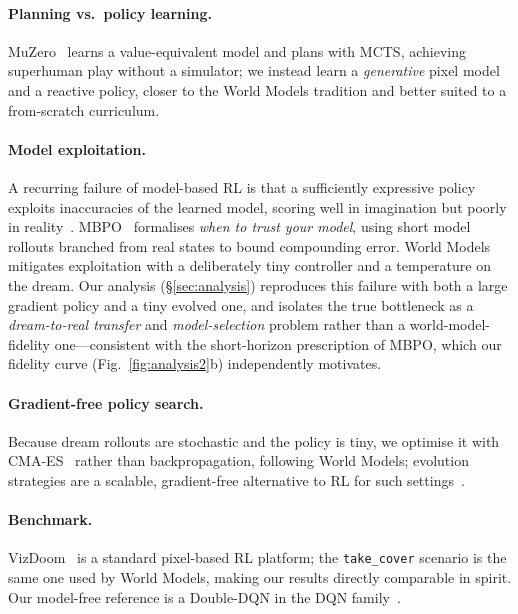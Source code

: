 \documentclass[11pt]{article}
\begin{document}
\paragraph{Planning vs.\ policy learning.} MuZero~\cite{schrittwieser2020} learns a value-equivalent
model and plans with MCTS, achieving superhuman play without a simulator; we instead learn a
\emph{generative} pixel model and a reactive policy, closer to the World Models tradition and better
suited to a from-scratch curriculum.

\paragraph{Model exploitation.} A recurring failure of model-based RL is that a sufficiently
expressive policy exploits inaccuracies of the learned model, scoring well in imagination but
poorly in reality~\cite{ha2018,janner2019}. MBPO~\cite{janner2019} formalises \emph{when to trust
your model}, using short model rollouts branched from real states to bound compounding error. World
Models mitigates exploitation with a deliberately tiny controller and a temperature on the dream.
Our analysis (\S\ref{sec:analysis}) reproduces this failure with both a large gradient policy and a
tiny evolved one, and isolates the true bottleneck as a \emph{dream-to-real transfer} and
\emph{model-selection} problem rather than a world-model-fidelity one---consistent with the
short-horizon prescription of MBPO, which our fidelity curve (Fig.~\ref{fig:analysis2}b) independently
motivates.

\paragraph{Gradient-free policy search.} Because dream rollouts are stochastic and the policy is
tiny, we optimise it with CMA-ES~\cite{hansen2001} rather than backpropagation, following World
Models; evolution strategies are a scalable, gradient-free alternative to RL for such
settings~\cite{salimans2017}.

\paragraph{Benchmark.} VizDoom~\cite{kempka2016} is a standard pixel-based RL platform; the
\texttt{take\_cover} scenario is the same one used by World Models, making our results directly
comparable in spirit. Our model-free reference is a Double-DQN in the DQN family~\cite{mnih2015}.
\end{document}
